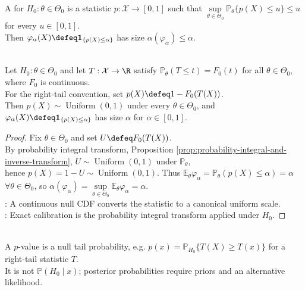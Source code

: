 \begin{definition} \label{def:p-value-and-validity} \\
A  for $H_0:\theta\in\Theta_0$ is a statistic $p:\mathcal{X}\to[0,1]$ such that $\sup\limits_{\theta\in\Theta_0}\mathbb{P}_\theta\{p(X)\leq u\}\leq u$ for every $u\in[0,1]$.\\
Then $\varphi_\alpha(X)\defeq\mathbf{1}_{\{p(X)\leq\alpha\}}$ has size $\alpha(\varphi_\alpha)\leq\alpha$.
\end{definition}

\begin{proposition} \label{prop:continuous-null-p-value-uniform} \\
Let $H_0:\theta\in\Theta_0$ and let $T:\mathcal{X}\to\R$ satisfy $\mathbb{P}_\theta(T\leq t)=F_0(t)$ for all $\theta\in\Theta_0$, where $F_0$ is continuous.\\
For the right-tail convention, set $p(X)\defeq1-F_0(T(X))$.\\
Then $p(X)\sim\operatorname{Uniform}(0,1)$ under every $\theta\in\Theta_0$, and $\varphi_\alpha(X)\defeq\mathbf{1}_{\{p(X)\leq\alpha\}}$ has size $\alpha$ for $\alpha\in[0,1]$.
\begin{proof} Fix $\theta\in\Theta_0$ and set $U\defeq F_0(T(X))$.\\
By probability integral transform, Proposition \ref{prop:probability-integral-and-inverse-transform}, $U\sim\operatorname{Uniform}(0,1)$ under $\mathbb{P}_\theta$,\\
hence $p(X)=1-U\sim\operatorname{Uniform}(0,1)$. Thus $\mathbb{E}_\theta\varphi_\alpha=\mathbb{P}_\theta(p(X)\leq\alpha)=\alpha$ $\forall \theta\in\Theta_0$, so $\alpha(\varphi_\alpha)=\sup\limits_{\theta\in\Theta_0}\mathbb{E}_\theta\varphi_\alpha=\alpha$.\\
: A continuous null CDF converts the statistic to a canonical uniform scale.\\
: Exact calibration is the probability integral transform applied under $H_0$.
\end{proof}
\end{proposition}

\begin{remark} \label{rem:p-values-are-not-posterior-probabilities} \\
A $p$-value is a null tail probability, e.g. $p(x)=\mathbb{P}_{H_0}\{T(X)\geq T(x)\}$ for a right-tail statistic $T$.\\
It is not $\mathbb{P}(H_0\mid x)$; posterior probabilities require priors and an alternative likelihood.
\end{remark}

